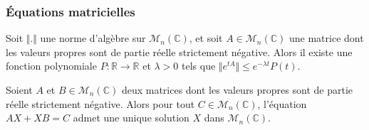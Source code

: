   \subsubsection{Équations matricielles}


  \begin{lemma}
    Soit $\Vert . \Vert$ une norme d'algèbre sur $\mathcal{M}_n(\mathbb{C})$, et soit $A \in \mathcal{M}_n(\mathbb{C})$ une matrice dont les valeurs propres sont de partie réelle strictement négative. Alors il existe une fonction polynomiale $P : \mathbb{R} \rightarrow \mathbb{R}$ et $\lambda > 0$ tels que $\Vert e^{tA} \Vert \leq e^{- \lambda t} P(t)$.
  \end{lemma}


  \begin{application}
    Soient $A$ et $B \in \mathcal{M}_n(\mathbb{C})$ deux matrices dont les valeurs propres sont de partie réelle strictement négative. Alors pour tout $C \in \mathcal{M}_n(\mathbb{C})$, l'équation $AX + XB = C$ admet une unique solution $X$ dans $\mathcal{M}_n(\mathbb{C})$.
  \end{application}

